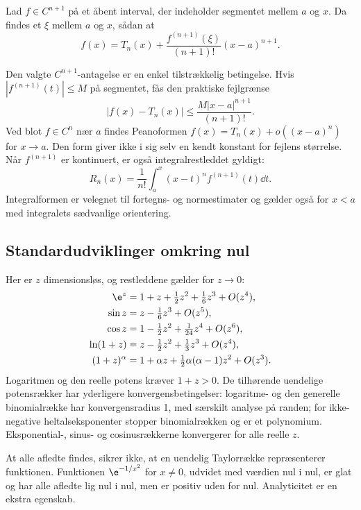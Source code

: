 \begin{saetning}
Lad $f\in C^{n+1}$ på et åbent interval, der indeholder segmentet mellem $a$ og $x$. Da findes et $\xi$ mellem $a$ og $x$, sådan at
\begin{equation}
 f(x)=T_n(x)+\frac{f^{(n+1)}(\xi)}{(n+1)!}(x-a)^{n+1}.
 \label{eq:rest}
\end{equation}
\end{saetning}
Den valgte $C^{n+1}$-antagelse er en enkel tilstrækkelig betingelse. Hvis $|f^{(n+1)}(t)|\le M$ på segmentet, fås den praktiske fejlgrænse
\[
 |f(x)-T_n(x)|\le\frac{M|x-a|^{n+1}}{(n+1)!}.
\]
Ved blot $f\in C^n$ nær $a$ findes Peanoformen $f(x)=T_n(x)+o((x-a)^n)$ for $x\to a$. Den form giver ikke i sig selv en kendt konstant for fejlens størrelse. Når $f^{(n+1)}$ er kontinuert, er også integralrestleddet gyldigt:
\[
 R_n(x)=\frac{1}{n!}\int_a^x (x-t)^n f^{(n+1)}(t)\dd t.
\]
Integralformen er velegnet til fortegns- og normestimater og gælder også for $x<a$ med integralets sædvanlige orientering.

\subsection{Standardudviklinger omkring nul}
Her er $z$ dimensionsløs, og restleddene gælder for $z\to0$:
\begin{align*}
 \e^z&=1+z+\tfrac12z^2+\tfrac16z^3+O(z^4),\\
 \sin z&=z-\tfrac16z^3+O(z^5),\\
 \cos z&=1-\tfrac12z^2+\tfrac1{24}z^4+O(z^6),\\
 \ln(1+z)&=z-\tfrac12z^2+\tfrac13z^3+O(z^4),\\
 (1+z)^\alpha&=1+\alpha z+\tfrac12\alpha(\alpha-1)z^2+O(z^3).
\end{align*}
Logaritmen og den reelle potens kræver $1+z>0$. De tilhørende uendelige potensrækker har yderligere konvergensbetingelser: logaritme- og den generelle binomialrække har konvergensradius 1, med særskilt analyse på randen; for ikke-negative heltalseksponenter stopper binomialrækken og er et polynomium. Eksponential-, sinus- og cosinusrækkerne konvergerer for alle reelle $z$.

At alle afledte findes, sikrer ikke, at en uendelig Taylorrække repræsenterer funktionen. Funktionen $\e^{-1/x^2}$ for $x\ne0$, udvidet med værdien nul i nul, er glat og har alle afledte lig nul i nul, men er positiv uden for nul. Analyticitet er en ekstra egenskab.



